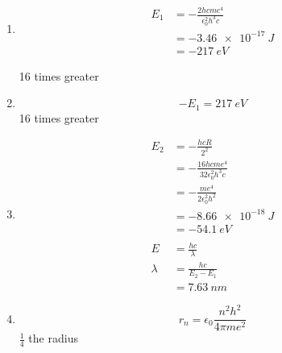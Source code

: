 \documentclass{article}
\begin{document}
\setcounter{subsubsection}{20}
\subsubsection{}

\begin{enumerate}
  \item

        \begin{align*}
          E_1 & = -\frac{2 h c m e^4}{\epsilon_0^2 h^3 c} \\
              & = \qty{-3.46e-17}{J}                      \\
              & = \qty{-217}{eV}
        \end{align*}

        16 times greater

  \item \[-E_1 = \qty{217}{eV}\] 16 times greater

  \item

        \begin{align*}
          E_2     & = -\frac{h c R}{2^2}                          \\
                  & = -\frac{16 h c m e^4}{32 \epsilon_0^2 h^3 c} \\
                  & = -\frac{m e^4}{2 \epsilon_0^2 h^2}           \\
                  & = \qty{-8.66e-18}{J}                          \\
                  & = \qty{-54.1}{eV}                             \\ \\
          E       & = \frac{h c}{\lambda}                         \\
          \lambda & = \frac{h c}{E_2 - E_1}                       \\
                  & = \qty{7.63}{nm}
        \end{align*}

  \item \[r_n = \epsilon_0 \frac{n^2 h^2}{4 \pi m e^2}\] $\frac{1}{4}$ the radius
\end{enumerate}

\setcounter{subsubsection}{22}
\subsubsection{}
\end{document}
